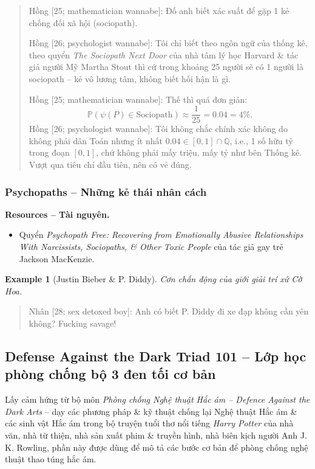 \documentclass[12pt]{article}
\newtheorem{example}{Example}
\begin{document}
\begin{quote}
	{\sf Hồng [25; mathematician wannabe]}: Đố anh biết xác suất để gặp 1 kẻ chống đối xã hội (sociopath).
	
	{\sf Hồng [26; psychologist wannabe]}: Tôi chỉ biết theo ngôn ngữ của thống kê, theo quyển {\it The Sociopath Next Door} của nhà tâm lý học Harvard \& tác giả người Mỹ {\sc Martha Stout} thì cứ trong khoảng 25 người sẽ có 1 người là sociopath -- kẻ vô lương tâm, không biết hối hận là gì.
	
	{\sf Hồng [25; mathematician wannabe]}: Thế thì quá đơn giản:
	\begin{equation*}
		\mathbb{P}(\psi(P)\in\mbox{Sociopath})\approx\frac{1}{25} = 0.04 = 4\%.
	\end{equation*}
	{\sf Hồng [26; psychologist wannabe]}: Tôi không chắc chính xác không do không phải dân Toán nhưng ít nhất $0.04\in[0,1]\cap\mathbb{Q}$, i.e., 1 số hữu tỷ trong đoạn $[0,1]$, chứ không phải mấy triệu, mấy tỷ như bên Thống kê. Vượt qua tiêu chí đầu tiên, nên có vẻ đúng.
\end{quote}

\subsubsection{Psychopaths -- Những kẻ thái nhân cách}
\textbf{\textsf{Resources -- Tài nguyên.}}
\begin{itemize}
	\item Quyển {\it Psychopath Free: Recovering from Emotionally Abusive Relationships With Narcissists, Sociopaths, \& Other Toxic People} \cite{MacKenzie2015} của tác giả gay trẻ {\sc Jackson MacKenzie}.
\end{itemize}

\begin{example}[{\sc Justin Bieber} \& P. Diddy]
	Cơn chấn động của giới giải trí xứ Cờ Hoa.
\end{example}

\begin{quote}
	{\sf Nhân [28; sex detoxed boy]}: Anh có biết P. Diddy đi xe đạp không cần yên không? Fucking savage!
\end{quote}


\subsection{Defense Against the Dark Triad 101 -- Lớp học phòng chống bộ 3 đen tối cơ bản}
Lấy cảm hứng từ bộ môn {\it Phòng chống Nghệ thuật Hắc ám -- Defence Against the Dark Arts} -- dạy các phương pháp \& kỹ thuật chống lại Nghệ thuật Hắc ám \& các sinh vật Hắc ám trong bộ truyện tuổi thơ nổi tiếng {\it Harry Potter} của nhà văn, nhà từ thiện, nhà sản xuất phim \& truyền hình, nhà biên kịch người Anh {\sc J. K. Rowling}, phần này được dùng để mô tả các bước cơ bản để phòng chống nghệ thuật thao túng hắc ám.
\end{document}
